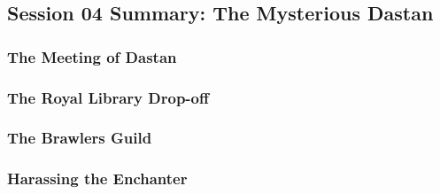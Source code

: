 \subsection{Session 04 Summary: The Mysterious Dastan}

\subsubsection{The Meeting of Dastan}

\subsubsection{The Royal Library Drop-off}

\subsubsection{The Brawlers Guild}

\subsubsection{Harassing the Enchanter}